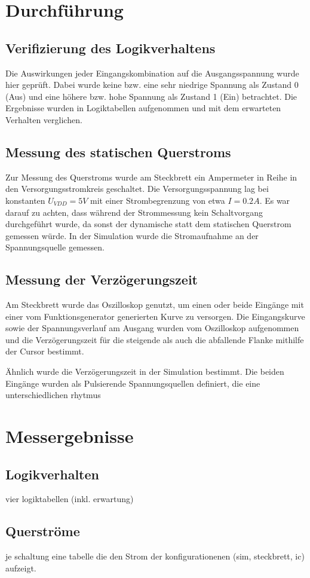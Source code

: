 \documentclass[11pt, a4paper]{article}
\begin{document}
\section*{Durchführung}
\subsection*{Verifizierung des Logikverhaltens}
Die Auswirkungen jeder Eingangskombination auf die Ausgangsspannung wurde hier geprüft. Dabei wurde keine bzw. eine sehr niedrige Spannung als Zustand 0 (Aus) und eine höhere bzw. hohe Spannung als Zustand 1 (Ein) betrachtet. Die Ergebnisse wurden in Logiktabellen aufgenommen und mit dem erwarteten Verhalten verglichen.
\subsection*{Messung des statischen Querstroms}
Zur Messung des Querstroms wurde am Steckbrett ein Ampermeter in Reihe in den Versorgungsstromkreis geschaltet.
Die Versorgungsspannung lag bei konstanten $U_{VDD} = 5V$ mit einer Strombegrenzung von etwa $I = 0.2A$. Es war darauf zu achten, dass während der Strommessung kein Schaltvorgang durchgeführt wurde, da sonst der dynamische statt dem statischen Querstrom gemessen würde.
In der Simulation wurde die Stromaufnahme an der Spannungsquelle gemessen. 
\subsection*{Messung der Verzögerungszeit}
Am Steckbrett wurde das Oszilloskop genutzt, um einen oder beide Eingänge mit einer vom Funktionsgenerator generierten Kurve zu versorgen. Die Eingangskurve sowie der Spannungsverlauf am Ausgang wurden vom Oszilloskop aufgenommen und die Verzögerungszeit für die steigende als auch die abfallende Flanke mithilfe der Cursor bestimmt.

Ähnlich wurde die Verzögerungszeit in der Simulation bestimmt. Die beiden Eingänge wurden als Pulsierende Spannungsquellen definiert, die eine unterschiedlichen rhytmus
\section*{Messergebnisse}
\subsection*{Logikverhalten}
vier logiktabellen (inkl. erwartung)

\subsection*{Querströme}
je schaltung eine tabelle die den Strom der konfigurationenen (sim, steckbrett, ic) aufzeigt.
\end{document}
